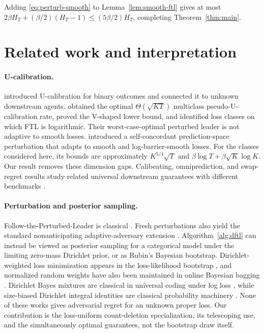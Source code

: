 \documentclass{article}
\theoremstyle{definition}
\theoremstyle{remark}
\begin{document}
Adding \eqref{eq:perturb-smooth} to Lemma~\ref{lem:smooth-ftl} gives at most $2\beta H_T+(\beta/2)(H_T-1)\leq(5\beta/2)H_T$, completing Theorem~\ref{thm:main}.

\section{Related work and interpretation}\label{sec:related}

\paragraph{U-calibration.}
\citet{kleinberg2023ucal} introduced U-calibration for binary outcomes and connected it to unknown downstream agents.  \citet{luo2024optimal} obtained the optimal $\Theta(\sqrt{KT})$ multiclass pseudo-U-calibration rate, proved the V-shaped lower bound, and identified loss classes on which FTL is logarithmic.  Their worst-case-optimal perturbed leader is not adaptive to smooth losses.  \citet{frongillo2026simultaneous} introduced a self-concordant prediction-space perturbation that adapts to smooth and log-barrier-smooth losses.  For the classes considered here, its bounds are approximately $K^{5/4}\sqrt T$ and $\beta\log T+\beta\sqrt K\log K$.  Our result removes these dimension gaps. Calibeating, omniprediction, and swap-regret results study related universal downstream guarantees with different benchmarks \citep{roth2024forecasting,chen2026calibeating}.

\paragraph{Perturbation and posterior sampling.}
Follow-the-Perturbed-Leader is classical \citep{kalai2005efficient,cesabianchi2006prediction}.  Fresh perturbations also yield the standard nonanticipating adaptive-adversary extension \citep{hutter2005adaptive}.  Algorithm~\ref{alg:dftl} can instead be viewed as posterior sampling for a categorical model under the limiting zero-mass Dirichlet prior, or as Rubin's Bayesian bootstrap.  Dirichlet-weighted loss minimization appears in the loss-likelihood bootstrap \citep{lyddon2019general}, and normalized random weights have also been maintained in online Bayesian bagging \citep{lee2004lossless}.  Dirichlet Bayes mixtures are classical in universal coding under log loss \citep{watanabe2013achievability}, while size-biased Dirichlet integral identities are classical probability machinery \citep{last2020integral}. None of these works gives adversarial regret for an unknown proper loss.  Our contribution is the loss-uniform count-deletion specialization, its telescoping use, and the simultaneously optimal guarantees, not the bootstrap draw itself.
\end{document}
